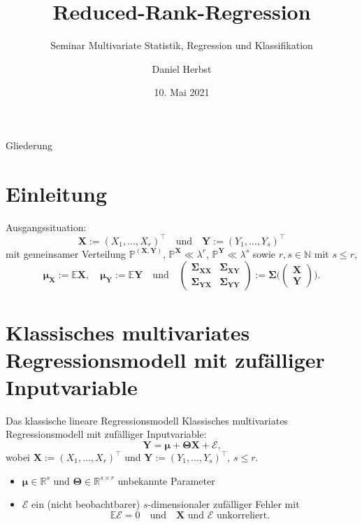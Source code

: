 \documentclass[12pt, aspectratio=169]{beamer}
\title{Reduced-Rank-Regression}
\subtitle{Seminar Multivariate Statistik, Regression und Klassifikation}
\author{Daniel Herbst}
\date{10. Mai 2021}
\newcommand{\Pb}{\mathbb{P}}
\newcommand{\E}{\mathbb{E}}
\newcommand{\R}{\mathbb{R}}
\newcommand{\N}{\mathbb{N}}
\newcommand{\X}{\mathbf{X}}
\newcommand{\Y}{\mathbf{Y}}
\newcommand{\T}{\bm{\Theta}}
\newcommand{\muu}{\bm{\mu}}
\newcommand{\Ssigma}{\bm{\Sigma}}
\begin{document}
	
\begin{frame}[plain]
    \maketitle
\end{frame}

\begin{frame}{Gliederung}
	\tableofcontents
\end{frame}

\section{Einleitung}

\begin{frame}
	Ausgangssituation:
	$$\X := (X_1, \dots, X_r)^\top \quad \text{und} \quad \Y := (Y_1, \dots, Y_s)^\top$$
	mit gemeinsamer Verteilung $\Pb^{(\X, \Y)}$, $\Pb^\X \ll \lambda^r$, $\Pb^\Y \ll \lambda^s$ sowie $r, s \in \N$ mit $s \leq r$,
	$$ \muu_\X := \E\X, \quad \muu_\Y := \E\Y \quad \text{und} \quad \begin{pmatrix}
	\Ssigma_{\X\X} & \Ssigma_{\X\Y} \\
	\Ssigma_{\Y\X} & \Ssigma_{\Y\Y}
	\end{pmatrix} := \Ssigma \biggl(\begin{pmatrix}
	\X \\
	\Y
	\end{pmatrix}\biggr).$$
\end{frame}

\section{Klassisches multivariates Regressionsmodell mit zufälliger Inputvariable}

\begin{frame}{Das klassische lineare Regressionsmodell}
	Klassisches multivariates Regressionsmodell mit zufälliger Inputvariable:
	\[ \Y = \muu + \T \X + \mathcal{E} \text{,}\]
	wobei $\X := (X_1, \dots, X_r)^\top$ und $\Y := (Y_1, \dots, Y_s)^\top$, $s \leq r$.
	\begin{itemize}
		\item $\muu \in \R^s$ und $\T \in \R^{s \times r}$ unbekannte Parameter
		\item $\mathcal{E}$ ein (nicht beobachtbarer) $s$-dimensionaler zufälliger Fehler mit
		$$\E \mathcal{E} = 0 \quad \text{und} \quad \X \text{ und } \mathcal{E} \text{ unkorreliert.}$$
	\end{itemize}
\end{frame}
\end{document}
